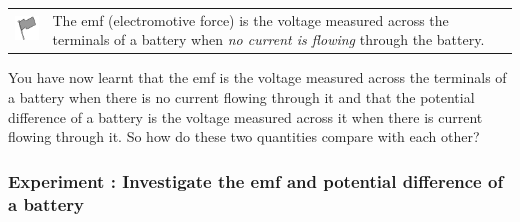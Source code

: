 \vspace{\rubberspace}\par
        \label{m38772*emf}\begin{definition}
	  \begin{tabular*}{15 cm}{m{15 mm}m{}}
	\hspace*{-50pt}  \includegraphics[width=0.5in]{col11305.imgs/psflag2.png}   & \Definition{   \label{id2479864}\textbf{emf}} { \label{m38772*emf1meaning}
The emf (electromotive force) is the voltage measured across the terminals of a battery when \textsl{no current is flowing} through the battery.
 } 
      \end{tabular*}
      \end{definition}
\par 

	\label{m38772*ffgfgfgf}
	  You have now learnt that the emf is the voltage measured across the terminals of a battery when there is no current flowing through it and that the potential difference of a battery is the voltage measured across it when there is current flowing through it. So how do these two quantities compare with each other? 
	\par   

	\label{m38772*secfhsst!!!underscore!!!id1616s1}
            \subsubsection{ Experiment : Investigate the emf and potential difference of a battery }
            \nopagebreak
            
